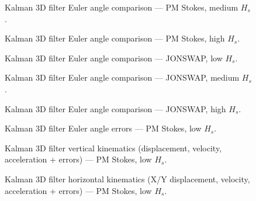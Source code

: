 \documentclass[11pt,letterpaper]{article}
\begin{document}
\begin{figure}[H]\centering
  \resizebox{\textwidth}{!}{}
  \caption{Kalman 3D filter Euler angle comparison — PM Stokes, medium $H_s$.}
  \label{fig:w3d_pmstokes_medium}
\end{figure}

\begin{figure}[H]\centering
  \resizebox{\textwidth}{!}{}
  \caption{Kalman 3D filter Euler angle comparison — PM Stokes, high $H_s$.}
  \label{fig:w3d_pmstokes_high}
\end{figure}

\begin{figure}[H]\centering
  \resizebox{\textwidth}{!}{}
  \caption{Kalman 3D filter Euler angle comparison — JONSWAP, low $H_s$.}
  \label{fig:w3d_jonswap_low}
\end{figure}

\begin{figure}[H]\centering
  \resizebox{\textwidth}{!}{}
  \caption{Kalman 3D filter Euler angle comparison — JONSWAP, medium $H_s$.}
  \label{fig:w3d_jonswap_medium}
\end{figure}

\begin{figure}[H]\centering
  \resizebox{\textwidth}{!}{}
  \caption{Kalman 3D filter Euler angle comparison — JONSWAP, high $H_s$.}
  \label{fig:w3d_jonswap_high}
\end{figure}


\begin{figure}[H]\centering
  \resizebox{\textwidth}{!}{}
  \caption{Kalman 3D filter Euler angle errors — PM Stokes, low $H_s$.}
  \label{fig:w3d_pmstokes_low_angle_errs}
\end{figure}

\begin{figure}[H]\centering
  \resizebox{\textwidth}{!}{}
  \caption{Kalman 3D filter vertical kinematics (displacement, velocity, acceleration + errors) — PM Stokes, low $H_s$.}
  \label{fig:w3d_pmstokes_low_zkin}
\end{figure}

\begin{figure}[H]\centering
  \resizebox{\textwidth}{!}{}
  \caption{Kalman 3D filter horizontal kinematics (X/Y displacement, velocity, acceleration + errors) — PM Stokes, low $H_s$.}
  \label{fig:w3d_pmstokes_low_xykin}
\end{figure}
\end{document}
